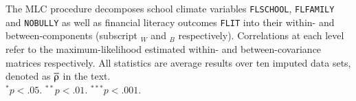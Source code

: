 {\begin{tabular}{cl r@{\hskip -0.1mm}l r@{\hskip -0.1mm}l r@{\hskip -0.1mm}l r@{\hskip -0.1mm}l r@{\hskip -0.1mm}l r@{\hskip -0.1mm}l r@{\hskip -0.1mm}l r@{\hskip -0.1mm}l r@{\hskip -0.1mm}l r@{\hskip -0.1mm}l}
        \cmidrule{1-14}
      \end{tabular}%
}{The MLC procedure decomposes school climate variables \texttt{FLSCHOOL}, \texttt{FLFAMILY} and \texttt{NOBULLY} as well as financial literacy outcomes \texttt{FLIT} into their within- and between-components (subscript $_W$ and $_B$ respectively). Correlations at each level refer to the maximum-likelihood estimated within- and between-covariance matrices respectively. All statistics are average results over ten imputed data sets, denoted as $\lbar{\rho}$ in the text.\\
$^* p < .05$. $^{**} p < .01$. $^{***} p < .001$.}
